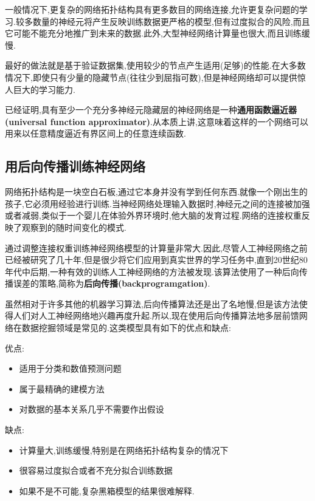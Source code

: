 \documentclass[11pt,a4paper,oneside]{book}
\begin{document}
一般情况下,更复杂的网络拓扑结构具有更多数目的网络连接,允许更复杂问题的学习.较多数量的神经元将产生反映训练数据更严格的模型,但有过度拟合的风险,而且它可能不能充分地推广到未来的数据.此外,大型神经网络计算量也很大,而且训练缓慢.

最好的做法就是基于验证数据集,使用较少的节点产生适用(足够)的性能.在大多数情况下,即使只有少量的隐藏节点(往往少到屈指可数),但是神经网络却可以提供惊人巨大的学习能力.

\begin{tcolorbox}[colback=pink!10!white,colframe=pink!100!black]
已经证明,具有至少一个充分多神经元隐藏层的神经网络是一种\textbf{通用函数逼近器(universal function approximator)}.从本质上讲,这意味着这样的一个网络可以用来以任意精度逼近有界区间上的任意连续函数.
\end{tcolorbox}

\subsection{用后向传播训练神经网络}
网络拓扑结构是一块空白石板,通过它本身并没有学到任何东西.就像一个刚出生的孩子,它必须用经验进行训练.当神经网络处理输入数据时,神经元之间的连接被加强或者减弱,类似于一个婴儿在体验外界环境时,他大脑的发育过程.网络的连接权重反映了观察到的随时间变化的模式.

通过调整连接权重训练神经网络模型的计算量非常大.因此,尽管人工神经网络之前已经被研究了几十年,但是很少将它们应用到真实世界的学习任务中,直到20世纪80年代中后期,一种有效的训练人工神经网络的方法被发现.该算法使用了一种后向传播误差的策略,简称为\textbf{后向传播(backprogramgation)}.

虽然相对于许多其他的机器学习算法,后向传播算法还是出了名地慢,但是该方法使得人们对人工神经网络地兴趣再度升起.所以,现在使用后向传播算法地多层前馈网络在数据挖掘领域是常见的.这类模型具有如下的优点和缺点:
\begin{tcolorbox}[colback=pink!10!white,colframe=pink!100!black]
优点:
\begin{itemize}
	\item 适用于分类和数值预测问题
	\item 属于最精确的建模方法
	\item 对数据的基本关系几乎不需要作出假设
\end{itemize}
\end{tcolorbox}

\begin{tcolorbox}[colback=pink!10!white,colframe=pink!100!black]
缺点:
\begin{itemize}
	\item 计算量大,训练缓慢,特别是在网络拓扑结构复杂的情况下
	\item 很容易过度拟合或者不充分拟合训练数据
	\item 如果不是不可能,复杂黑箱模型的结果很难解释.
\end{itemize}
\end{tcolorbox}
\end{document}
